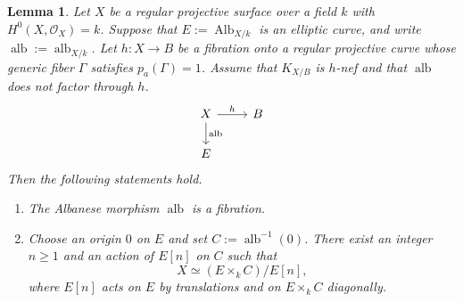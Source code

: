 \documentclass[10pt,abstract=true]{scrartcl}
\numberwithin{equation}{section}
\newtheorem{lemma}[theorem]{Lemma}
\theoremstyle{definition}
\theoremstyle{remark}
\DeclareMathOperator\Alb{Alb}
\DeclareMathOperator\alb{alb}
\begin{document}
\begin{lemma}\label{lemm:sur-second-fibration}
  Let $X$ be a regular projective surface over a field $k$ with $H^0(X,\mathcal O_X)=k$.
  Suppose that $E:=\Alb_{X/k}$ is an elliptic curve, and write $\alb:=\alb_{X/k}$.
  Let $h\colon X\to B$ be a fibration onto a regular projective curve whose generic fiber $\Gamma$ satisfies $p_a(\Gamma)=1$.
  Assume that $K_{X/B}$ is $h$-nef and that $\alb$ does not factor through $h$.
  \[
  \begin{tikzcd}
    X \rar{h} \dar{\alb} & B \\
    E
  \end{tikzcd}
  \]
  Then the following statements hold.
  \begin{enumerate}[label=\textup{(\arabic*)}]
    \item The Albanese morphism $\alb$ is a fibration.
    \item Choose an origin $0$ on $E$ and set $C:=\alb^{-1}(0)$.
      There exist an integer $n\geq1$ and an action of $E[n]$ on $C$ such that
      \[
        X\simeq(E\times_k C)/E[n],
      \]
      where $E[n]$ acts on $E$ by translations and on $E\times_k C$ diagonally.
  \end{enumerate}
\end{lemma}
\end{document}

